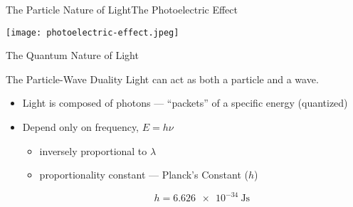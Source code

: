 \documentclass[handout,notes=hide]{beamer}
\begin{document}
\begin{frame}{The Particle Nature of Light}{The Photoelectric Effect}
	\begin{center}
		\texttt{[image: photoelectric-effect.jpeg]}
	\end{center}

\end{frame}

\begin{frame}{The Quantum Nature of Light}
	\begin{block}{The Particle-Wave Duality}
		Light can act as both a particle and a wave.
	\end{block}

	\begin{itemize}
		\item Light is composed of photons --- ``packets'' of a specific
			energy (\alert{quantized})
		\item Depend only on frequency, $E = h \nu$
			\begin{itemize}
				\item inversely proportional to $\lambda$
				\item proportionality constant --- \alert{Planck's
					Constant ($h$)}

					\begin{equation*}
						h =
						\SI{6.626e-34}{\joule\second}
					\end{equation*}
			\end{itemize}
	\end{itemize}
\end{frame}

\end{document}

